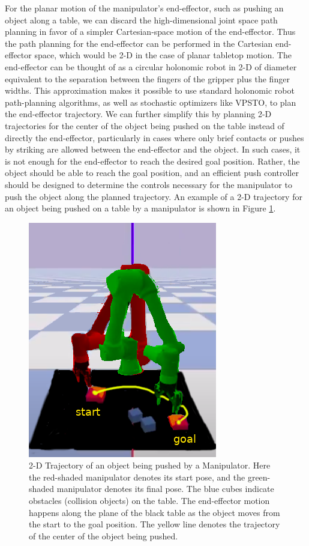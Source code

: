 For the planar motion of the manipulator's end-effector, such as pushing an object along a table, we can discard the high-dimensional joint space path planning in favor of a simpler Cartesian-space motion of the end-effector. Thus the path planning for the end-effector can be performed in the Cartesian end-effector space, which would be 2-D in the case of planar tabletop motion. The end-effector can be thought of as a circular holonomic robot in 2-D of diameter equivalent to the separation between the fingers of the gripper plus the finger widths. This approximation makes it possible to use standard holonomic robot path-planning algorithms, as well as stochastic optimizers like VPSTO, to plan the end-effector trajectory. We can further simplify this by planning 2-D trajectories for the center of the object being pushed on the table instead of directly the end-effector, particularly in cases where only brief contacts or pushes by striking are allowed between the end-effector and the object. In such cases, it is not enough for the end-effector to reach the desired goal position. Rather, the object should be able to reach the goal position, and an efficient push controller should be designed to determine the controls necessary for the manipulator to push the object along the planned trajectory. An example of a 2-D trajectory for an object being pushed on a table by a manipulator is shown in Figure \ref{fig:end-eff-traj}.

\begin{figure}[ht]
    \centering
    \includegraphics[scale=0.5]{figures/bl-manipulator/end_eff_traj.png}
    \caption[2-D Trajectory of an object being pushed by a Manipulator]{2-D Trajectory of an object being pushed by a Manipulator. Here the red-shaded manipulator denotes its start pose, and the green-shaded manipulator denotes its final pose. The blue cubes indicate obstacles (collision objects) on the table. The end-effector motion happens along the plane of the black table as the object moves from the start to the goal position. The yellow line denotes the trajectory of the center of the object being pushed.}
    \label{fig:end-eff-traj}
\end{figure}

